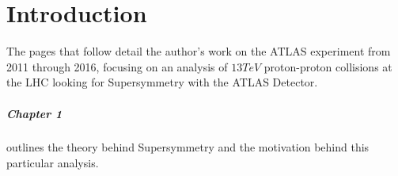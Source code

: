
\chapter{Introduction} %

\label{ch:introduction} %

The pages that follow detail the author's work on the ATLAS experiment from 2011 through 2016, focusing on an analysis of $13 TeV$ proton-proton collisions at the \ac{LHC} looking for Supersymmetry with the ATLAS Detector. 

\paragraph{Chapter 1} outlines the theory behind Supersymmetry and the motivation behind this particular analysis. 
